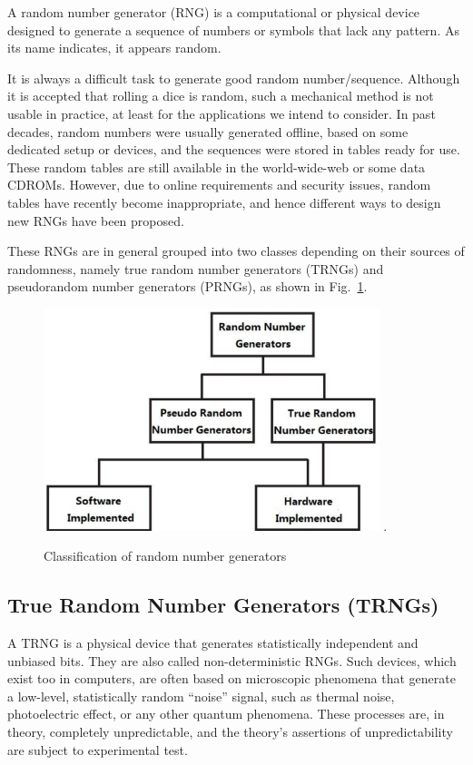 A random number generator (RNG) is a computational or physical device designed to generate a sequence of numbers or symbols that lack any pattern. As its name indicates, it appears random.

It is always a difficult task to generate good random number/sequence. Although it is accepted that rolling a dice
is random, such a mechanical method is not 
usable in practice, at least for the applications we
intend to consider. 
In past decades, random numbers were usually  generated offline, based on some dedicated setup or devices, and the sequences were stored in tables ready for use. These random tables are still available in the world-wide-web or some data CDROMs.
However, due to online requirements and security issues, random tables have recently become inappropriate, and hence different ways to design new RNGs have been proposed.

These RNGs are in general grouped into two classes depending on their sources of randomness, namely true random number generators (TRNGs) and pseudorandom number generators (PRNGs), as shown in Fig.~\ref{Classification}. 

\begin{figure}
\centering
\includegraphics[width=3.85in]{Classification.eps}
\DeclareGraphicsExtensions.
\caption{Classification of random number generators}
\label{Classification}
\end{figure}



\subsection{True Random Number Generators (TRNGs)}
A TRNG is a physical device that generates statistically independent and unbiased bits. They are also
called non-deterministic RNGs. Such devices, which
exist too in computers, are often based on microscopic phenomena that generate a low-level, statistically random ``noise'' signal, such as thermal noise, photoelectric effect, or any other quantum phenomena. These processes are, in theory, completely unpredictable, and the theory's assertions of unpredictability are subject to experimental test. 

